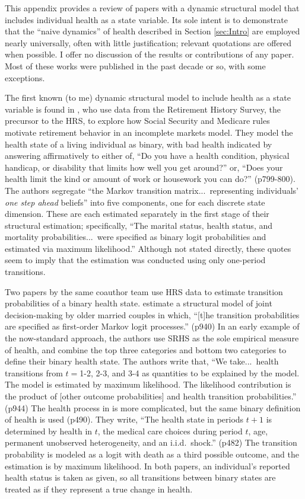 \documentclass[12pt,pdftex,letterpaper]{article}
\begin{document}
This appendix provides a review of papers with a dynamic structural model that includes individual health as a state variable.  Its sole intent is to demonstrate that the ``naive dynamics'' of health described in Section \ref{sec:Intro} are employed nearly universally, often with little justification; relevant quotations are offered when possible.  I offer no discussion of the results or contributions of any paper.  Most of these works were published in the past decade or so, with some exceptions.

The first known (to me) dynamic structural model to include health as a state variable is found in \cite{RustPhelan97}, who use data from the Retirement History Survey, the precursor to the HRS, to explore how Social Security and Medicare rules motivate retirement behavior in an incomplete markets model.  They model the health state of a living individual as binary, with bad health indicated by answering affirmatively to either of, ``Do you have a health condition, physical handicap, or disability that limits how well you get around?'' or, ``Does your health limit the kind or amount of work or housework you can do?'' (p799-800).  The authors segregate ``the Markov transition matrix...\ representing individuals' \textit{one step ahead} beliefs'' into five components, one for each discrete state dimension.  These are each estimated separately in the first stage of their structural estimation; specifically, ``The marital status, health status, and mortality probabilities...\ were specified as binary logit probabilities and estimated via maximum likelihood.''  Although not stated directly, these quotes seem to imply that the estimation was conducted using only one-period transitions.

Two papers by the same coauthor team use HRS data to estimate transition probabilities of a binary health state.  \cite{BlauGilleskie06} estimate a structural model of joint decision-making by older married couples in which, ``[t]he transition probabilities are specified as first-order Markov logit processes.'' (p940)  In an early example of the now-standard approach, the authors use SRHS as the sole empirical measure of health, and combine the top three categories and bottom two categories to define their binary health state.  The authors write that, ``We take...\ health transitions from $t=$1-2, 2-3, and 3-4 as quantities to be explained by the model.  The model is estimated by maximum likelihood. The likelihood contribution is the product of [other outcome probabilities] and health transition probabilities.'' (p944)  The health process in \cite{BlauGilleskie08} is more complicated, but the same binary definition of health is used (p490).  They write, ``The health state in periods $t+1$ is determined by health in $t$, the medical care choices during period $t$, age, permanent unobserved heterogeneity, and an i.i.d.\ shock.'' (p482)  The transition probability is modeled as a logit with death as a third possible outcome, and the estimation is by maximum likelihood.  In both papers, an individual's reported health status is taken as given, so all transitions between binary states are treated as if they represent a true change in health.
\end{document}
